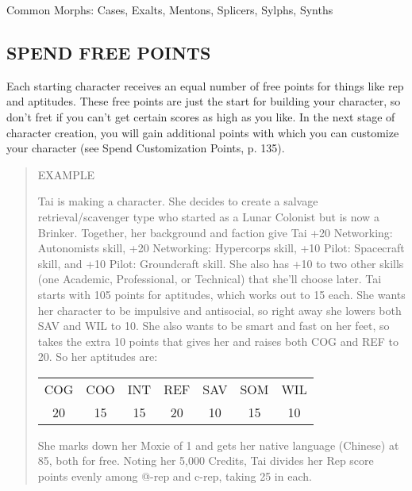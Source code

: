 Common Morphs: Cases, Exalts, Mentons, Splicers, Sylphs, Synths

 \subsection{SPEND FREE POINTS}

 Each starting character receives an equal number of free points for things
 like rep and aptitudes. These free points are just the start for building your
 character, so don’t fret if you can’t get certain scores as high as you
 like. In the next stage of character creation, you will gain additional points
 with which you can customize your character (see Spend Customization Points,
 p. 135).


\begin{quotation}
EXAMPLE

Tai is making a character. She decides to create a salvage
retrieval/scavenger type who started as a Lunar Colonist but is now a
Brinker. Together, her background and faction give Tai +20 Networking:
Autonomists skill, +20 Networking: Hypercorps skill, +10 Pilot: Spacecraft
skill, and +10 Pilot: Groundcraft skill. She also has +10 to two other skills
(one Academic, Professional, or Technical) that she’ll choose later.  Tai
starts with 105 points for aptitudes, which works out to 15 each. She wants her
character to be impulsive and antisocial, so right away she lowers both SAV and
WIL to 10. She also wants to be smart and fast on her feet, so takes the extra
10 points that gives her and raises both COG and REF to 20. So her aptitudes
are:
 
\begin{center}
  \begin{tabular}{ccccccc}
    COG & COO & INT & REF & SAV & SOM & WIL \\ 
    20 & 15 & 15 & 20 & 10 & 15 & 10 \\ 
  \end{tabular} 
\end{center}

She marks down her Moxie of 1 and gets her native language (Chinese) at 85,
both for free.  Noting her 5,000 Credits, Tai divides her Rep score points
evenly among @-rep and c-rep, taking 25 in each.



\end{quotation}
